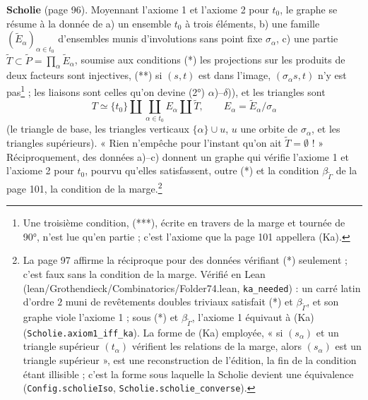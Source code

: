 \documentclass[11pt,a4paper]{article}
\begin{document}
\textbf{Scholie} (page 96). Moyennant l'axiome 1 et l'axiome 2 pour $t_0$, le
graphe se résume à la donnée de a) un ensemble $t_0$ à trois éléments, b) une
famille $(\widetilde E_\alpha)_{\alpha \in t_0}$ d'ensembles munis d'involutions
sans point fixe $\sigma_\alpha$, c) une partie $\widetilde T \subset \widetilde P
= \prod_\alpha \widetilde E_\alpha$, soumise aux conditions (*) les projections
sur les produits de deux facteurs sont injectives, (**) si $(s, t)$ est dans
l'image, $(\sigma_\alpha s, t)$ n'y est pas\footnote{Une troisième condition,
(***), écrite en travers de la marge et tournée de 90°, n'est lue qu'en
partie ; c'est l'axiome que la page 101 appellera (Ka).} ; les liaisons sont
celles qu'on devine (2°) $\alpha$)--$\delta$)), et les triangles sont
\[
T \simeq \lbrace t_0\rbrace \amalg \coprod_{\alpha \in t_0} E_\alpha \amalg
\widetilde T, \qquad E_\alpha = \widetilde E_\alpha / \sigma_\alpha
\]
(le triangle de base, les triangles verticaux $\lbrace \alpha\rbrace \cup u$,
$u$ une orbite de $\sigma_\alpha$, et les triangles supérieurs). « Rien
n'empêche pour l'instant qu'on ait $\widetilde T = \emptyset$ ! »
Réciproquement, des données a)--c) donnent un graphe qui vérifie l'axiome 1 et
l'axiome 2 pour $t_0$, pourvu qu'elles satisfassent, outre (*) et la
condition $\beta_{\widetilde\Gamma}$ de la page 101, la condition de la
marge.\footnote{La page 97 affirme la réciproque pour des données vérifiant
(*) seulement ; c'est faux sans la condition de la marge. Vérifié en Lean
(lean/Grothendieck/Combinatorics/Folder74.lean, \texttt{ka\_needed}) : un carré latin
d'ordre $2$ muni de revêtements doubles triviaux satisfait (*) et
$\beta_{\widetilde\Gamma}$, et son graphe viole l'axiome 1 ; sous (*) et
$\beta_{\widetilde\Gamma}$, l'axiome 1 équivaut à (Ka)
(\texttt{Scholie.axiom1\_iff\_ka}). La forme de (Ka) employée, « si
$(s_\alpha)$ et un triangle supérieur $(t_\alpha)$ vérifient les relations de
la marge, alors $(s_\alpha)$ est un triangle supérieur », est une
reconstruction de l'édition, la fin de la condition étant illisible ; c'est la
forme sous laquelle la Scholie devient une équivalence
(\texttt{Config.scholieIso}, \texttt{Scholie.scholie\_converse}).}
\end{document}
